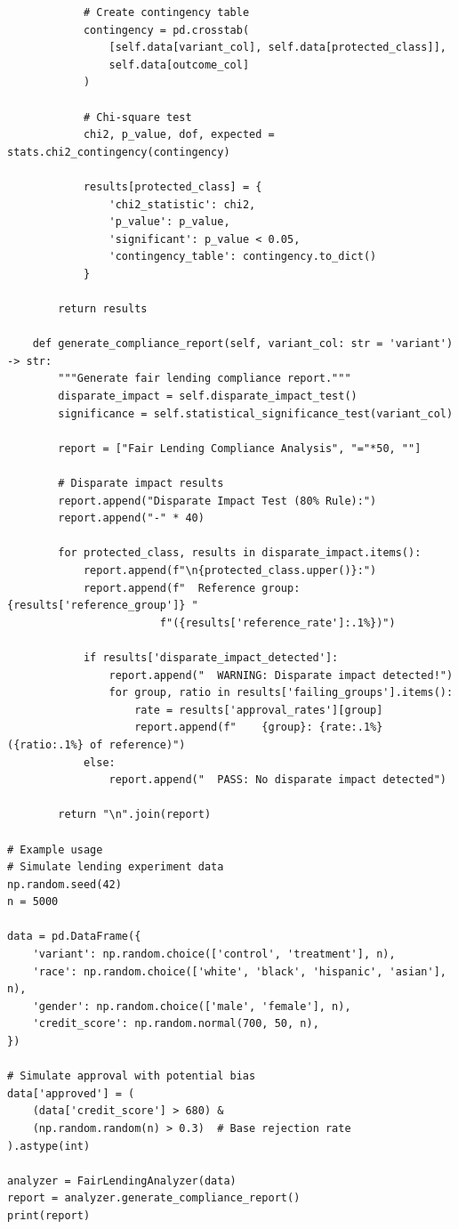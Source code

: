 \begin{lstlisting}
            # Create contingency table
            contingency = pd.crosstab(
                [self.data[variant_col], self.data[protected_class]],
                self.data[outcome_col]
            )

            # Chi-square test
            chi2, p_value, dof, expected = stats.chi2_contingency(contingency)

            results[protected_class] = {
                'chi2_statistic': chi2,
                'p_value': p_value,
                'significant': p_value < 0.05,
                'contingency_table': contingency.to_dict()
            }

        return results

    def generate_compliance_report(self, variant_col: str = 'variant') -> str:
        """Generate fair lending compliance report."""
        disparate_impact = self.disparate_impact_test()
        significance = self.statistical_significance_test(variant_col)

        report = ["Fair Lending Compliance Analysis", "="*50, ""]

        # Disparate impact results
        report.append("Disparate Impact Test (80% Rule):")
        report.append("-" * 40)

        for protected_class, results in disparate_impact.items():
            report.append(f"\n{protected_class.upper()}:")
            report.append(f"  Reference group: {results['reference_group']} "
                        f"({results['reference_rate']:.1%})")

            if results['disparate_impact_detected']:
                report.append("  WARNING: Disparate impact detected!")
                for group, ratio in results['failing_groups'].items():
                    rate = results['approval_rates'][group]
                    report.append(f"    {group}: {rate:.1%} ({ratio:.1%} of reference)")
            else:
                report.append("  PASS: No disparate impact detected")

        return "\n".join(report)

# Example usage
# Simulate lending experiment data
np.random.seed(42)
n = 5000

data = pd.DataFrame({
    'variant': np.random.choice(['control', 'treatment'], n),
    'race': np.random.choice(['white', 'black', 'hispanic', 'asian'], n),
    'gender': np.random.choice(['male', 'female'], n),
    'credit_score': np.random.normal(700, 50, n),
})

# Simulate approval with potential bias
data['approved'] = (
    (data['credit_score'] > 680) &
    (np.random.random(n) > 0.3)  # Base rejection rate
).astype(int)

analyzer = FairLendingAnalyzer(data)
report = analyzer.generate_compliance_report()
print(report)
\end{lstlisting}

